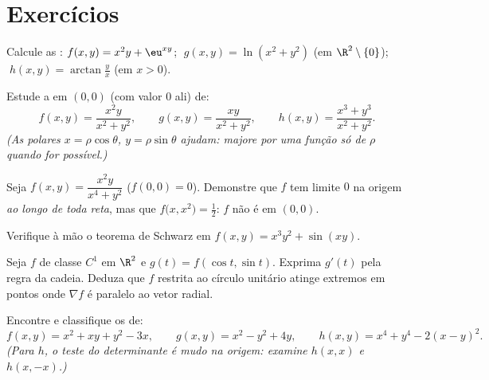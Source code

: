 \section{Exercícios}

\begin{exercise}[$\star$]\label{exo:b1:multivar:1}
Calcule as : $f(x,y) = x^2 y + \eu^{xy}$; $\;g(x,y) = \ln(x^2 + y^2)$ (em $\R^2\setminus\{0\}$); $\;h(x,y) = \arctan\frac yx$ (em
$x > 0$).
\end{exercise}

\begin{exercise}[$\star$]\label{exo:b1:multivar:2}
Estude a  em $(0,0)$ (com valor $0$ ali) de:
\[
f(x,y) = \frac{x^2 y}{x^2 + y^2},
\qquad
g(x,y) = \frac{xy}{x^2 + y^2},
\qquad
h(x,y) = \frac{x^3 + y^3}{x^2 + y^2}.
\]
\emph{(As  polares $x = \rho\cos\theta$, $y = \rho\sin\theta$ ajudam: majore por uma
função só de $\rho$ quando for possível.)}
\end{exercise}

\begin{exercise}[$\star\star$]\label{exo:b1:multivar:3}
Seja $f(x,y) = \dfrac{x^2 y}{x^4 + y^2}$ ($f(0,0) = 0$). Demonstre que $f$ tem limite $0$ na origem
\emph{ao longo de toda reta}, mas que $f\bigl(x, x^2\bigr) = \frac12$: $f$ não é  em
$(0,0)$.
\end{exercise}

\begin{exercise}[$\star$]\label{exo:b1:multivar:4}
Verifique à mão o teorema de Schwarz em $f(x, y) = x^3 y^2 + \sin(xy)$.
\end{exercise}

\begin{exercise}[$\star\star$]\label{exo:b1:multivar:5}
Seja $f$ de classe $C^1$ em $\R^2$ e $g(t) = f(\cos t, \sin t)$. Exprima $g'(t)$ pela
regra da cadeia. Deduza que $f$ restrita ao círculo unitário atinge
extremos em pontos onde $\nabla f$ é paralelo ao vetor radial.
\end{exercise}

\begin{exercise}[$\star\star$]\label{exo:b1:multivar:6}
Encontre e classifique os  de:
\[
f(x, y) = x^2 + xy + y^2 - 3x,
\qquad
g(x, y) = x^2 - y^2 + 4y,
\qquad
h(x, y) = x^4 + y^4 - 2(x - y)^2 .
\]
\emph{(Para $h$, o teste do determinante é mudo na origem: examine
$h(x, x)$ e $h(x, -x)$.)}
\end{exercise}

